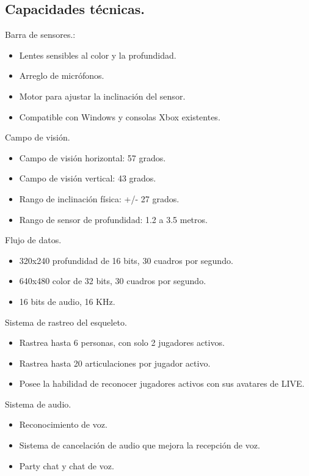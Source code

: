 \documentclass[11pt,a4paper]{article}
\begin{document}
\subsection{Capacidades técnicas\cite{rakuten}.} 
Barra de sensores\cite{rakuten}.:
\begin{itemize} %
	\item Lentes sensibles al color y la profundidad.
	\item Arreglo de micrófonos.
	\item Motor para ajustar la inclinación del sensor.
	\item Compatible con Windows y consolas Xbox existentes.
\end{itemize}
Campo de visión.
\begin{itemize} 
	\item Campo de visión horizontal: 57 grados.
	\item Campo de visión vertical: 43 grados.
	\item Rango de inclinación física: +/- 27 grados.
	\item Rango de sensor de profundidad:  1.2 a 3.5 metros.
\end{itemize}
Flujo de datos. 
\begin{itemize} 
	\item 320x240  profundidad de 16 bits, 30 cuadros por segundo.
	\item 640x480 color de 32 bits, 30 cuadros por segundo.
	\item 16 bits de audio, 16 KHz.
\end{itemize}
Sistema de rastreo del esqueleto.
\begin{itemize} 
	\item Rastrea hasta 6 personas, con solo 2 jugadores activos.
	\item Rastrea hasta 20 articulaciones por jugador activo.
	\item Posee la habilidad de reconocer jugadores activos con sus avatares de LIVE.
\end{itemize}
Sistema de audio.
\begin{itemize} 
	\item Reconocimiento de voz.
	\item Sistema de cancelación de audio que mejora la recepción de voz.
	\item Party chat y chat de voz.
\end{itemize}
\end{document}
